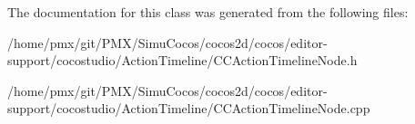 The documentation for this class was generated from the following files\+:\begin{DoxyCompactItemize}
\item 
/home/pmx/git/\+P\+M\+X/\+Simu\+Cocos/cocos2d/cocos/editor-\/support/cocostudio/\+Action\+Timeline/C\+C\+Action\+Timeline\+Node.\+h\item 
/home/pmx/git/\+P\+M\+X/\+Simu\+Cocos/cocos2d/cocos/editor-\/support/cocostudio/\+Action\+Timeline/C\+C\+Action\+Timeline\+Node.\+cpp\end{DoxyCompactItemize}

